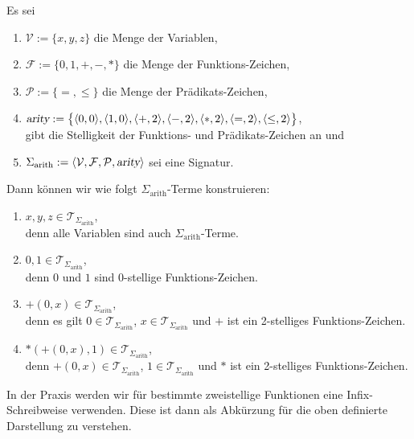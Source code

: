 \example
Es sei 
\begin{enumerate}
\item $\mathcal{V} := \{ x, y, z \}$ die Menge der Variablen,
\item $\mathcal{F} := \{ 0, 1, \mathtt{+}, \mathtt{-}, * \}$ die Menge der Funktions-Zeichen,
\item $\mathcal{P} := \{\mathtt{=}, \leq\}$ die Menge der Pr\"{a}dikats-Zeichen,
\item $\textsl{arity} := \bigl\{ \pair(0,0), \pair(1,0), \pair(\mathtt{+},2), \pair(\mathtt{-},2),
  \pair(*,2), \pair(=,2), \pair(\leq,2) \bigr\}$, \\[0.2cm]
      gibt die Stelligkeit der Funktions- und Pr\"{a}dikats-Zeichen an und
\item $\Sigma_\mathrm{arith} := \langle \mathcal{V}, \mathcal{F}, \mathcal{P}, \textsl{arity} \rangle$
      sei eine Signatur.
\end{enumerate}
Dann k\"{o}nnen wir wie folgt $\Sigma_{\mathrm{arith}}$-Terme konstruieren:
\begin{enumerate}
\item $x, y, z \in \mathcal{T}_{\Sigma_{\mathrm{arith}}}$, \\[0.2cm]
      denn alle Variablen sind auch $\Sigma_{\mathrm{arith}}$-Terme.
\item $0, 1 \in \mathcal{T}_{\Sigma_{\mathrm{arith}}}$,  \\[0.2cm]
      denn $0$ und $1$ sind $0$-stellige Funktions-Zeichen.
\item $\mathtt{+}(0,x) \in \mathcal{T}_{\Sigma_{\mathrm{arith}}}$, \\[0.2cm]
      denn es gilt $0 \in \mathcal{T}_{\Sigma_{\mathrm{arith}}}$, $x \in \mathcal{T}_{\Sigma_{\mathrm{arith}}}$ und 
      $\mathtt{+}$ ist ein 2-stelliges Funktions-Zeichen.
\item $*(\mathtt{+}(0,x),1) \in \mathcal{T}_{\Sigma_{\mathrm{arith}}}$, \\[0.2cm]
      denn $\mathtt{+}(0,x) \in \mathcal{T}_{\Sigma_{\mathrm{arith}}}$, $1 \in \mathcal{T}_{\Sigma_{\mathrm{arith}}}$ und
      $*$ ist ein 2-stelliges Funktions-Zeichen.
\end{enumerate}
In der Praxis werden wir f\"{u}r bestimmte zweistellige Funktionen eine Infix-Schreibweise
verwenden.  Diese ist dann als Abk\"{u}rzung f\"{u}r die oben definierte Darstellung zu verstehen.
\eox



